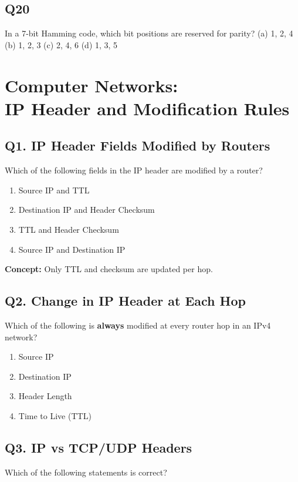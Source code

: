 \subsection*{Q20}
In a 7-bit Hamming code, which bit positions are reserved for parity?  
(a) 1, 2, 4  
(b) 1, 2, 3  
(c) 2, 4, 6  
(d) 1, 3, 5

\newpage
\section[Computer Networks: IP Header and Modification Rules]
{Computer Networks:\\ IP Header and Modification Rules}

\subsection*{Q1. IP Header Fields Modified by Routers}
Which of the following fields in the IP header are modified by a router?

\begin{enumerate}[label=(\alph*)]
    \item Source IP and TTL
    \item Destination IP and Header Checksum
    \item TTL and Header Checksum
    \item Source IP and Destination IP
\end{enumerate}

\textbf{Concept:} Only TTL and checksum are updated per hop.



\subsection*{Q2. Change in IP Header at Each Hop}
Which of the following is \textbf{always} modified at every router hop in an IPv4 network?

\begin{enumerate}[label=(\alph*)]
    \item Source IP
    \item Destination IP
    \item Header Length
    \item Time to Live (TTL)
\end{enumerate}

\newpage
\subsection*{Q3. IP vs TCP/UDP Headers}
Which of the following statements is correct?

